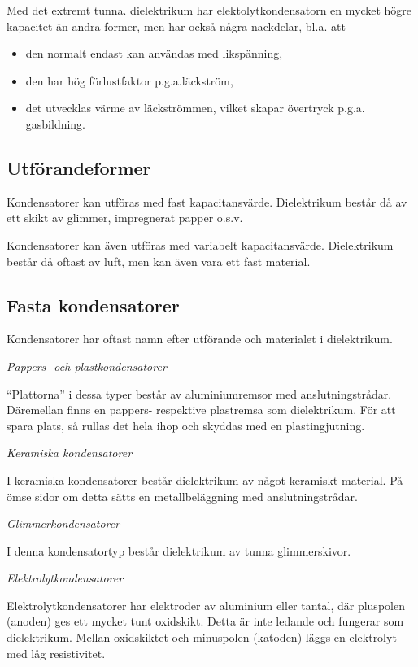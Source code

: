 Med det extremt tunna. dielektrikum har elektolytkondensatorn en mycket högre
kapacitet än andra former, men har också några nackdelar, bl.a. att
\begin{itemize}
  \item den normalt endast kan användas med likspänning,
  \item den har hög förlustfaktor p.g.a.läckström,
  \item det utvecklas värme av läckströmmen, vilket skapar övertryck p.g.a.
    gasbildning.
\end{itemize}


\subsection{Utförandeformer}

Kondensatorer kan utföras med fast kapacitansvärde. Dielektrikum består då av
ett skikt av glimmer, impregnerat papper o.s.v.

Kondensatorer kan även utföras med variabelt kapacitansvärde. Dielektrikum
består då oftast av luft, men kan även vara ett fast material.

\subsection{Fasta kondensatorer}

Kondensatorer har oftast namn efter utförande och materialet i dielektrikum.

\emph{Pappers- och plastkondensatorer}

``Plattorna'' i dessa typer består av aluminiumremsor med anslutningstrådar.
Däremellan finns en pappers- respektive plastremsa som dielektrikum. För att
spara plats, så rullas det hela ihop och skyddas med en plastingjutning.

\emph{Keramiska kondensatorer}

I keramiska kondensatorer består dielektrikum av något keramiskt material. På
ömse sidor om detta sätts en metallbeläggning med anslutningstrådar.

\emph{Glimmerkondensatorer}

I denna kondensatortyp består dielektrikum av tunna glimmerskivor.

\emph{Elektrolytkondensatorer}

Elektrolytkondensatorer har elektroder av aluminium eller tantal, där pluspolen
(anoden) ges ett mycket tunt oxidskikt. Detta är inte ledande och fungerar som
dielektrikum. Mellan oxidskiktet och minuspolen (katoden) läggs en elektrolyt
med låg resistivitet.

